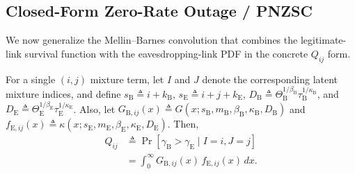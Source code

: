 \documentclass[lettersize,journal]{IEEEtran}
\begin{document}
\subsection{Closed-Form Zero-Rate Outage / PNZSC}

We now generalize the Mellin--Barnes convolution that combines the
legitimate-link survival function with the eavesdropping-link PDF in the concrete \(Q_{ij}\) form.

For a single \((i,j)\) mixture term, let \(I\) and \(J\) denote the corresponding latent mixture indices, and define \(s_{\mathrm B}\triangleq i+k_{\mathrm B}\), \(s_{\mathrm E}\triangleq i+j+k_{\mathrm E}\), \(D_{\mathrm B}\triangleq\Theta_{\mathrm B}^{1/\beta_{\mathrm B}}\tau_{\mathrm B}^{1/\kappa_{\mathrm B}}\), and \(D_{\mathrm E}\triangleq\Theta_{\mathrm E}^{1/\beta_{\mathrm E}}\tau_{\mathrm E}^{1/\kappa_{\mathrm E}}\). Also, let \(G_{\mathrm B,ij}(x)\triangleq G(x;s_{\mathrm B},m_{\mathrm B},\beta_{\mathrm B},\kappa_{\mathrm B},D_{\mathrm B})\) and \(f_{\mathrm E,ij}(x)\triangleq\kappa(x;s_{\mathrm E},m_{\mathrm E},\beta_{\mathrm E},\kappa_{\mathrm E},D_{\mathrm E})\). Then,
\begin{equation}
\begin{aligned}
Q_{ij}
&\triangleq
\Pr[\gamma_{\mathrm B}>\gamma_{\mathrm E}\mid I=i,J=j]\\
&=\int_0^\infty
G_{\mathrm B,ij}(x)\,
f_{\mathrm E,ij}(x)\,dx .
\end{aligned}
\label{eq:Qijdef}
\end{equation}
\end{document}
